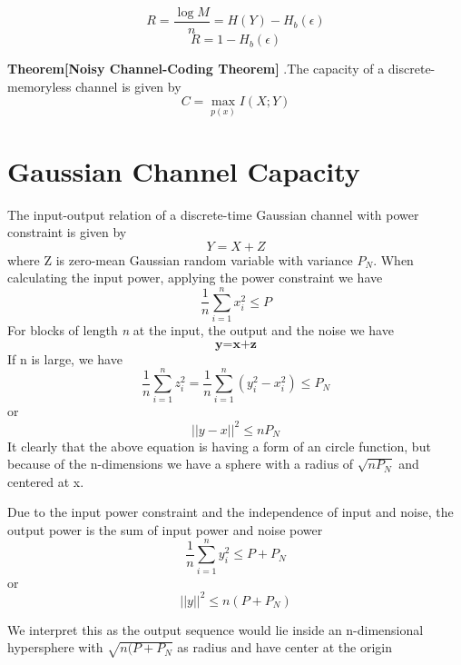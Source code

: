 \documentclass[a4paper, 13pt]{report}
\begin{document}
\begin{equation}
    R = \frac{\log M}{n} = H(Y) - H_b(\epsilon)
\end{equation}
\begin{equation}
    R = 1 - H_b(\epsilon)
\end{equation}

\par \textbf{Theorem[Noisy Channel-Coding Theorem]} .The capacity of a discrete-memoryless channel is given by
\begin{equation}
    C = \max_{p(x)}I(X;Y)
\end{equation}

\section{Gaussian Channel Capacity}
\par The input-output relation of a discrete-time Gaussian channel with power constraint is given by
\begin{equation}
    Y = X + Z
\end{equation}
where Z is zero-mean Gaussian random variable with variance $P_N$. When calculating the input power, applying the power constraint we have
\begin{equation}
    \frac{1}{n}\sum_{i=1}^{n}x_i^2\leq P
\end{equation}
For blocks of length \textit{n} at the input, the output and the noise we have
\begin{equation}
    \textbf{y=x+z}
\end{equation}
If n is large, we have
\begin{equation}
    \frac{1}{n}\sum_{i=1}^{n}z_i^2=\frac{1}{n}\sum_{i=1}^{n}(y_i^2-x_i^2)\leq P_N
\end{equation}
or
\begin{equation}
    ||y-x||^2 \leq nP_N
\end{equation}
It clearly that the above equation is having a form of an circle function, but because of the n-dimensions we have a sphere with a radius of $\sqrt{nP_N}$ and centered at x.
\par Due to the input power constraint and the independence of input and noise, the output power is the sum of input power and noise power
\begin{equation}
    \frac{1}{n}\sum_{i=1}^{n}y_i^2\leq P+P_N
\end{equation}
or
\begin{equation}
    ||y||^2\leq n(P+P_N)
\end{equation}
\par We interpret this as the output sequence would lie inside an n-dimensional hypersphere with $\sqrt{n(P+P_N}$ as radius and have center at the origin
\end{document}
